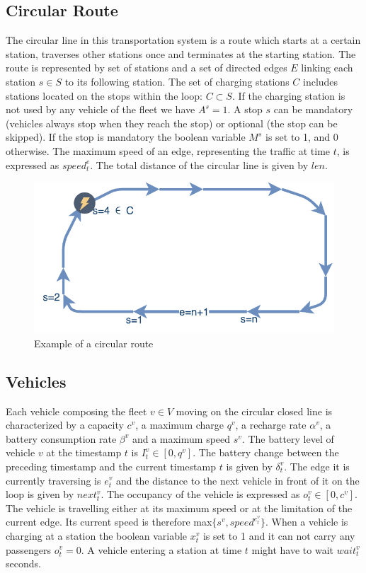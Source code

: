 \documentclass[12pt,a4paper]{article}
\begin{document}
\subsection{Circular Route}
The circular line in this transportation system is a route which starts at a certain station, traverses other stations once and terminates at the starting station. The route is represented by set of stations  and a set of directed edges $E$ linking each station $s \in S$ to its following station. The set of charging stations $C$ includes stations located on the stops within the loop: $C \subset S$. If the charging station is not used by any vehicle of the fleet we have $A^{s} = 1$. A stop $s$ can be mandatory (vehicles always stop when they reach the stop) or optional (the stop can be skipped). If the stop is mandatory the boolean variable $M^{s}$ is set to 1, and 0 otherwise. The maximum speed of an edge, representing the traffic at time $t$, is expressed as $speed^{e}_{t}$. The total distance of the circular line is given by $len$.

\begin{figure}[h] 
  \centering
\includegraphics[scale=0.7]{./images/loop.pdf}
\caption{Example of a circular route}
\label{fig:simulationFramework}
\end{figure}

\subsection{Vehicles}\label{vehicles}
Each vehicle composing the fleet $v \in V$ moving on the circular closed line is characterized by a capacity $c^{v}$, a maximum charge $q^{v}$, a recharge rate $\alpha^{v}$, a battery consumption rate $\beta^{v}$ and a maximum speed $s^{v}$. The battery level of vehicle $v$ at the timestamp $t$ is $I^{v}_{t} \in [0, q^{v}]$. The battery change between the preceding timestamp and the current timestamp $t$ is given by $\delta^{v}_{t}$. The edge it is currently traversing is $e^{v}_{t}$ and the distance to the next vehicle in front of it on the loop is given by $next^{v}_{t}$. The occupancy of the vehicle is expressed as $o^{v}_{t} \in [0, c^{v}]$. The vehicle is travelling either at its maximum speed or at the limitation of the current edge. Its current speed is therefore max$\{s^{v}, speed^{e^{v}_{t}}\}$. When a vehicle is charging at a station the boolean variable $x^{v}_{t}$ is set to 1 and it can not carry any passengers $o^{v}_{t} = 0$. A vehicle entering a station at time $t$ might have to wait $wait^{v}_{t}$ seconds.
\end{document}
